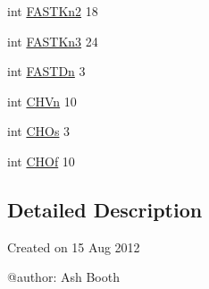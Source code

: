 \begin{DoxyCompactItemize}
\item 
int \hyperlink{namespaceparameters_a3fbbb0dba9ed624c45f25b7e5609b637}{F\-A\-S\-T\-Kn2} 18
\item 
int \hyperlink{namespaceparameters_a0991bf2a5f106fb30238dc7bb5c64c76}{F\-A\-S\-T\-Kn3} 24
\item 
int \hyperlink{namespaceparameters_a50dc470a1daf5c01b0f28bb418106e67}{F\-A\-S\-T\-Dn} 3
\item 
int \hyperlink{namespaceparameters_a0624d737223feb74f4f099865d49eb15}{C\-H\-Vn} 10
\item 
int \hyperlink{namespaceparameters_ae954ad96a784859e5de7bc705402f7c9}{C\-H\-Os} 3
\item 
int \hyperlink{namespaceparameters_ab7e0274ee0f8343f537b64c0e08b00db}{C\-H\-Of} 10
\end{DoxyCompactItemize}


\subsection{Detailed Description}
\begin{DoxyVerb}Created on 15 Aug 2012

@author: Ash Booth
\end{DoxyVerb}
 


